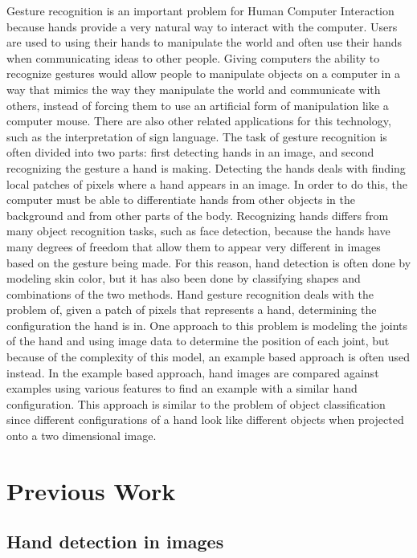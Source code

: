 \documentclass[10pt,twocolumn,letterpaper]{article}
\begin{document}
Gesture recognition is an important problem for Human Computer Interaction because hands provide a very natural way to interact with the computer. Users are used to using their hands to manipulate the world and often use their hands when communicating ideas to other people. Giving computers the ability to recognize gestures would allow people to manipulate objects on a computer in a way that mimics the way they manipulate the world and communicate with others, instead of forcing them to use an artificial form of manipulation like a computer mouse. There are also other related applications for this technology, such as the interpretation of sign language.
The task of gesture recognition is often divided into two parts: first detecting hands in an image, and second recognizing the gesture a hand is making. Detecting the hands deals with finding local patches of pixels where a hand appears in an image. In order to do this, the computer must be able to differentiate hands from other objects in the background and from other parts of the body. Recognizing hands differs from many object recognition tasks, such as face detection, because the hands have many degrees of freedom that allow them to appear very different in images based on the gesture being made. For this reason, hand detection is often done by modeling skin color, but it has also been done by classifying shapes and combinations of the two methods.
Hand gesture recognition deals with the problem of, given a patch of pixels that represents a hand, determining the configuration the hand is in. One approach to this problem is modeling the joints of the hand and using image data to determine the position of each joint, but because of the complexity of this model, an example based approach is often used instead. In the example based approach, hand images are compared against examples using various features to find an example with a similar hand configuration. This approach is similar to the problem of object classification since different configurations of a hand look like different objects when projected onto a two dimensional image.

\section{Previous Work}
\subsection{Hand detection in images}
\end{document}
